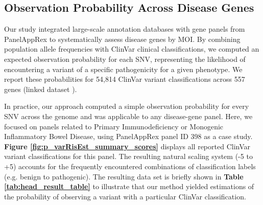 \subsection{Observation Probability Across Disease Genes}

Our study integrated large-scale annotation databases with gene panels from PanelAppRex to systematically assess disease genes by MOI. By combining population allele frequencies with ClinVar clinical classifications, we computed an expected observation probability for each SNV, representing the likelihood of encountering a variant of a specific pathogenicity for a given phenotype. We report these probabilities for 54,814 ClinVar variant classifications across 557 genes (linked dataset \cite{lawless_2025_15111584}).

In practice, our approach computed a simple observation probability for every SNV across the genome and was applicable to any disease-gene panel. Here, we focused on panels related to Primary Immunodeficiency or Monogenic Inflammatory Bowel Disease, using PanelAppRex panel ID 398 as a case study.
\textbf{Figure \ref{fig:p_varRisEst_summary_scores}} displays all reported ClinVar  variant classifications for this panel. The resulting natural scaling system (-5 to +5) accounts for the frequently encountered combinations of classification labels (e.g. benign to pathogenic).
The resulting data set \cite{lawless_2025_15111584} is briefly shown in \textbf{Table \ref{tab:head_result_table}} to illustrate that our method yielded estimations of the probability of observing a variant with a particular ClinVar classification. 


